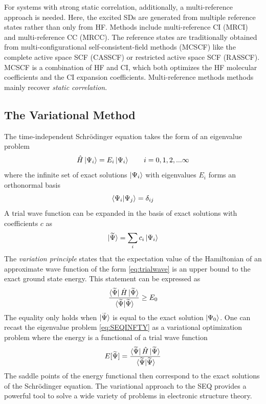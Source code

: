 For systems with strong static correlation, additionally, a multi-reference approach is needed. Here, the excited SDs are generated from multiple reference states rather than only from HF. Methods include multi-reference CI (MRCI) and multi-reference CC (MRCC). The reference states are traditionally obtained from multi-configurational self-consistent-field methods (MCSCF) like the complete active space SCF (CASSCF) or restricted active space SCF (RASSCF). MCSCF is a combination of HF and CI, which both optimizes the HF molecular coefficients and the CI expansion coefficients. Multi-reference methods methods mainly recover \emph{static correlation}. 

\subsection{The Variational Method}

The time-independent Schrödinger equation takes the form of an eigenvalue problem
\begin{equation}
\hat{H} \ket{\Psi_i} = E_i \ket{\Psi_i} \qquad i=0,1,2,...\infty
\label{eq:SEQINFTY}
\end{equation}
\noindent where the infinite set of exact solutions $\ket{\Psi_i}$ with eigenvalues $E_i$ forms an orthonormal basis
\begin{equation}
\bra{\Psi_i}\ket{\Psi_j} = \delta_{ij}
\end{equation} 
\noindent A trial wave function can be expanded in the basis of exact solutions with coefficients $c$ as
\begin{equation}
\ket{\smash{\widetilde{\Psi}}} = \sum_i c_i \ket{\Psi_i}
\label{eq:trialwave}
\end{equation}
\noindent The \emph{variation principle} states that the expectation value of the Hamiltonian of an approximate wave function of the form \ref{eq:trialwave} is an upper bound to the exact ground state energy. This statement can be expressed as
\begin{equation}
\frac{\bra{\tPsi}\hat{H}\ket{\tPsi}}{\vphantom{\widetilde{\Psi}} \bra{\tPsi}\ket{\tPsi}} \geq E_0
\end{equation}
\noindent The equality only holds when $\ket{\smash{\widetilde{\Psi}}}$ is equal to the exact solution $\ket{\Psi_0}$. One can recast the eigenvalue problem \ref{eq:SEQINFTY} as a variational optimization problem where the energy is a functional of a trial wave function
\begin{equation}
E[\tPsi] = \frac{\bra{\tPsi}\hat{H}\ket{\tPsi}}{\vphantom{\widetilde{\Psi}} \bra{\tPsi}\ket{\tPsi}}
\end{equation}
\noindent The saddle points of the energy functional then correspond to the exact solutions of the Schrödinger equation. The variational approach to the SEQ provides a powerful tool to solve a wide variety of problems in electronic structure theory.

